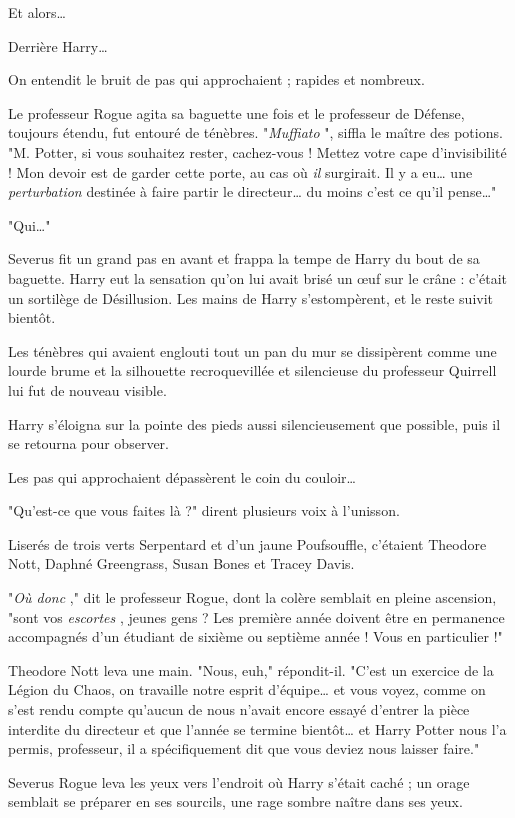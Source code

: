 Et alors…

Derrière Harry…

On entendit le bruit de pas qui approchaient ; rapides et nombreux.

Le professeur Rogue agita sa baguette une fois et le professeur de Défense, toujours étendu, fut entouré de ténèbres. "\emph{Muffiato} ", siffla le maître des potions. "M. Potter, si vous souhaitez rester, cachez-vous ! Mettez votre cape d'invisibilité ! Mon devoir est de garder cette porte, au cas où \emph{il}  surgirait. Il y a eu… une \emph{perturbation}  destinée à faire partir le directeur… du moins c'est ce qu'il pense…"

"Qui…"

Severus fit un grand pas en avant et frappa la tempe de Harry du bout de sa baguette. Harry eut la sensation qu'on lui avait brisé un œuf sur le crâne : c'était un sortilège de Désillusion. Les mains de Harry s'estompèrent, et le reste suivit bientôt.

Les ténèbres qui avaient englouti tout un pan du mur se dissipèrent comme une lourde brume et la silhouette recroquevillée et silencieuse du professeur Quirrell lui fut de nouveau visible.

Harry s'éloigna sur la pointe des pieds aussi silencieusement que possible, puis il se retourna pour observer.

Les pas qui approchaient dépassèrent le coin du couloir…

"Qu'est-ce que vous faites là ?" dirent plusieurs voix à l'unisson.

Liserés de trois verts Serpentard et d'un jaune Poufsouffle, c'étaient Theodore Nott, Daphné Greengrass, Susan Bones et Tracey Davis.

"\emph{Où donc} ," dit le professeur Rogue, dont la colère semblait en pleine ascension, "sont vos \emph{escortes} , jeunes gens ? Les première année doivent être en permanence accompagnés d'un étudiant de sixième ou septième année ! Vous en particulier !"

Theodore Nott leva une main. "Nous, euh," répondit-il. "C'est un exercice de la Légion du Chaos, on travaille notre esprit d'équipe… et vous voyez, comme on s'est rendu compte qu'aucun de nous n'avait encore essayé d'entrer la pièce interdite du directeur et que l'année se termine bientôt… et Harry Potter nous l'a permis, professeur, il a spécifiquement dit que vous deviez nous laisser faire."

Severus Rogue leva les yeux vers l'endroit où Harry s'était caché ; un orage semblait se préparer en ses sourcils, une rage sombre naître dans ses yeux.

